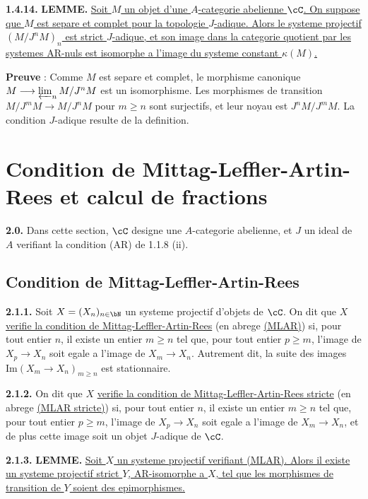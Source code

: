 \medskip
\noindent\textbf{1.4.14.} \textbf{LEMME.} \underline{Soit $M$ un objet d'une $A$-categorie abelienne $\cC$. On suppose que $M$ est separe et complet pour la topologie $J$-adique. Alors le systeme projectif $(M/J^n M)_n$ est strict $J$-adique, et son image dans la categorie quotient par les systemes AR-nuls est isomorphe a l'image du systeme constant $\kappa(M)$.}

\textbf{Preuve} : Comme $M$ est separe et complet, le morphisme canonique $M \longrightarrow \varprojlim_n M/J^n M$ est un isomorphisme. Les morphismes de transition $M/J^m M \longrightarrow M/J^n M$ pour $m \geq n$ sont surjectifs, et leur noyau est $J^n M / J^m M$. La condition $J$-adique resulte de la definition.

\section{Condition de Mittag-Leffler-Artin-Rees et calcul de fractions}

\medskip
\noindent\textbf{2.0.} Dans cette section, $\cC$ designe une $A$-categorie abelienne, et $J$ un ideal de $A$ verifiant la condition (AR) de 1.1.8 (ii).

\subsection{Condition de Mittag-Leffler-Artin-Rees}

\medskip
\noindent\textbf{2.1.1.} Soit $X = (X_n)_{n \in \bN}$ un systeme projectif d'objets de $\cC$. On dit que $X$ \underline{verifie la condition de Mittag-Leffler-Artin-Rees} (en abrege \underline{(MLAR)}) si, pour tout entier $n$, il existe un entier $m \geq n$ tel que, pour tout entier $p \geq m$, l'image de $X_p \longrightarrow X_n$ soit egale a l'image de $X_m \longrightarrow X_n$. Autrement dit, la suite des images $\mathrm{Im}(X_m \longrightarrow X_n)_{m \geq n}$ est stationnaire.

\medskip
\noindent\textbf{2.1.2.} On dit que $X$ \underline{verifie la condition de Mittag-Leffler-Artin-Rees stricte} (en abrege \underline{(MLAR stricte)}) si, pour tout entier $n$, il existe un entier $m \geq n$ tel que, pour tout entier $p \geq m$, l'image de $X_p \longrightarrow X_n$ soit egale a l'image de $X_m \longrightarrow X_n$, et de plus cette image soit un objet $J$-adique de $\cC$.

\medskip
\noindent\textbf{2.1.3.} \textbf{LEMME.} \underline{Soit $X$ un systeme projectif verifiant (MLAR). Alors il existe un systeme projectif strict $Y$, AR-isomorphe a $X$, tel que les morphismes de transition de $Y$ soient des epimorphismes.}

